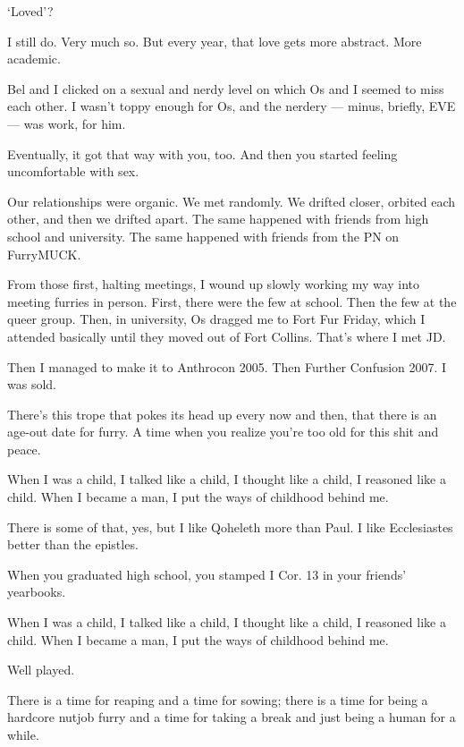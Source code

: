 \begin{paracol}{2}
\begin{leftcolumn}
\begin{ally}
`Loved'?
\end{ally}
I still do. Very much so. But every year, that love gets more abstract. More academic.

Bel and I clicked on a sexual and nerdy level on which Os and I seemed to miss each other. I wasn't toppy enough for Os, and the nerdery --- minus, briefly, EVE --- was work, for him.

\begin{ally}
Eventually, it got that way with you, too. And then you started feeling uncomfortable with sex.
\end{ally}
Our relationships were organic. We met randomly. We drifted closer, orbited each other, and then we drifted apart. The same happened with friends from high school and university. The same happened with friends from the PN on FurryMUCK.

From those first, halting meetings, I wound up slowly working my way into meeting furries in person. First, there were the few at school. Then the few at the queer group. Then, in university, Os dragged me to Fort Fur Friday, which I attended basically until they moved out of Fort Collins. That's where I met JD.

Then I managed to make it to Anthrocon 2005. Then Further Confusion 2007. I was sold.

There's this trope that pokes its head up every now and then, that there is an age-out date for furry. A time when you realize you're too old for this shit and peace.

\begin{ally}
When I was a child, I talked like a child, I thought like a child, I reasoned like a child. When I became a man, I put the ways of childhood behind me.
\end{ally}
There is some of that, yes, but I like Qoheleth more than Paul. I like Ecclesiastes better than the epistles.

\begin{ally}
When you graduated high school, you stamped I Cor. 13 in your friends' yearbooks.
\end{ally}
When I was a child, I talked like a child, I thought like a child, I reasoned like a child. When I became a man, I put the ways of childhood behind me.

\begin{ally}
Well played.
\end{ally}
There is a time for reaping and a time for sowing; there is a time for being a hardcore nutjob furry and a time for taking a break and just being a human for a while.


\end{leftcolumn}
\end{paracol}
